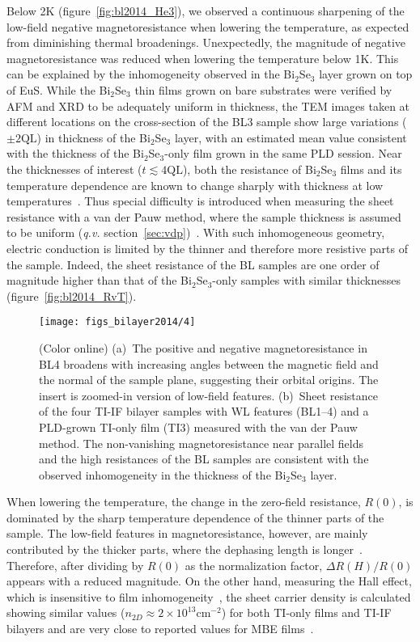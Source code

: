 Below 2K (figure~\ref{fig:bl2014_He3}), we observed a continuous sharpening of the low-field negative magnetoresistance when lowering the temperature, as expected from diminishing thermal broadenings. Unexpectedly, the magnitude of negative magnetoresistance was reduced when lowering the temperature below 1K. This can be explained by the inhomogeneity observed in the Bi$_2$Se$_3$ layer grown on top of EuS. While the Bi$_2$Se$_3$ thin films grown on bare substrates were verified by AFM and XRD to be adequately uniform in thickness, the TEM images taken at different locations on the cross-section of the BL3 sample show large variations ($\pm2\mathrm{QL}$) in thickness of the Bi$_2$Se$_3$ layer, with an estimated mean value consistent with the thickness of the Bi$_2$Se$_3$-only film grown in the same PLD session. Near the thicknesses of interest ($t\lesssim4\mathrm{QL}$), both the resistance of Bi$_2$Se$_3$ films and its temperature dependence are known to change sharply with thickness at low temperatures~\cite{TI_WAL_thickness}. Thus special difficulty is introduced when measuring the sheet resistance with a van der Pauw method, where the sample thickness is assumed to be uniform (\textit{q.v.} section~\ref{sec:vdp})~\cite{VdP1958, VdP_contact_size}. With such inhomogeneous geometry, electric conduction is limited by the thinner and therefore more resistive parts of the sample. Indeed, the sheet resistance of the BL samples are one order of magnitude higher than that of the Bi$_2$Se$_3$-only samples with similar thicknesses (figure~\ref{fig:bl2014_RvT}). %
%
\begin{figure}[ht]%
\centering%
\subfloat{\label{fig:bl2014_angular}}%
\subfloat{\label{fig:bl2014_RvT}}%
\texttt{[image: figs\_bilayer2014/4]}%
\caption[Angular dependence and temperature dependence of the transport properties of Bi$_2$Se$_3$--EuS bilayers]{(Color online) (a)~The positive and negative magnetoresistance in BL4 broadens with increasing angles between the magnetic field and the normal of the sample plane, suggesting their orbital origins. The insert is zoomed-in version of low-field features. (b)~Sheet resistance of the four TI-IF bilayer samples with WL features (BL1--4) and a PLD-grown TI-only film (TI3) measured with the van der Pauw method. The non-vanishing magnetoresistance near parallel fields and the high resistances of the BL samples are consistent with the observed inhomogeneity in the thickness of the Bi$_2$Se$_3$ layer.}%
\end{figure}%
%
When lowering the temperature, the change in the zero-field resistance, $R(0)$, is dominated by the sharp temperature dependence of the thinner parts of the sample. The low-field features in magnetoresistance, however, are mainly contributed by the thicker parts, where the dephasing length is longer~\cite{TI_WAL_thickness}. Therefore, after dividing by $R(0)$ as the normalization factor, $\Delta{}R(H)/R(0)$ appears with a reduced magnitude. On the other hand, measuring the Hall effect, which is insensitive to film inhomogeneity~\cite{Landauer_Porous_Media}, the sheet carrier density is calculated showing similar values (\(n_{2D}\approx2\times10^{13}\mathrm{cm^{-2}}\)) for both TI-only films and TI-IF bilayers and are very close to reported values for MBE films~\cite{TI_WAL_thickness}.

